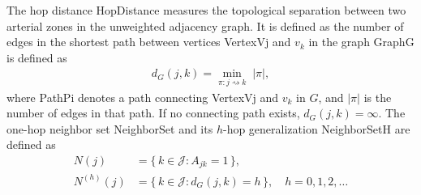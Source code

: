 The hop distance \gls{HopDistance} measures the topological separation between two arterial zones in the unweighted adjacency graph.
It is defined as the number of edges in the shortest path between vertices \gls{VertexVj} and $v_k$ in the graph \gls{GraphG} is defined as
\begin{align}
\label{eq:hop_distance}
d_G(j,k)
=\min_{\pi:j\rightsquigarrow k}\; |\pi|,
\end{align}
where \gls{PathPi} denotes a path connecting \gls{VertexVj} and $v_k$ in $G$, and $|\pi|$ is the number of edges in that path. 
If no connecting path exists, $d_G(j,k)=\infty$. 
The one-hop neighbor set \gls{NeighborSet} and its $h$-hop generalization \gls{NeighborSetH} are defined as
\begin{align}
\label{eq:direct_neibours}
N(j)        &= \{\, k\in\mathcal{J} : A_{jk}=1 \,\}, \\
\label{eq:hop_rings}
N^{(h)}(j)  &= \{\, k\in\mathcal{J} : d_G(j,k)=h \,\}, \quad h=0,1,2,\dots
\end{align}




